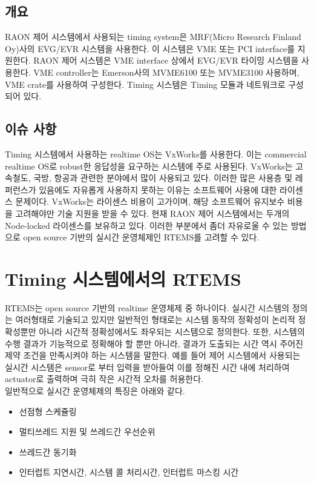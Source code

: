 \documentclass[11pt
  , a4paper
  , article
  , oneside
]{memoir}
\begin{document}
\section{개요}
RAON 제어 시스템에서 사용되는 timing system은 MRF(Micro Research Finland Oy)사의 EVG/EVR\cite{evgevr} 시스템을 사용한다. 이 시스템은 VME 또는 PCI interface를 지원한다. RAON 제어 시스템은 VME interface 상에서 EVG/EVR 타이밍 시스템을 사용한다. VME controller는 Emerson사의 MVME6100\cite{mvme6100} 또는 MVME3100\cite{mvme3100} 사용하며, VME crate를 사용하여 구성한다. Timing 시스템은 Timing 모듈과 네트워크로 구성되어 있다.

\section{이슈 사항}
Timing 시스템에서 사용하는 realtime OS는 VxWorks를 사용한다. 이는 commercial realtime OS로 robust한 응답성을 요구하는 시스템에 주로 사용된다. VxWorks는 고속철도, 국방, 항공과 관련한 분야에서 많이 사용되고 있다.
이러한 많은 사용층 및 레퍼런스가 있음에도 자유롭게 사용하지 못하는 이유는 소프트웨어 사용에 대한 라이센스 문제이다. VxWorks는 라이센스 비용이 고가이며, 해당 소프트웨어 유지보수 비용을 고려해야만 기술 지원을 받을 수 있다. 현재 RAON 제어 시스템에서는 두개의 Node-locked 라이센스를 보유하고 있다. 이러한 부분에서 좀더 자유로울 수 있는 방법으로 open source 기반의 실시간 운영체제인 RTEMS를 고려할 수 있다.

\chapter{Timing 시스템에서의 RTEMS}
RTEMS\cite{rtems}는 open source 기반의 realtime 운영체제 중 하나이다. 실시간 시스템의 정의는 여러형태로 기술되고 있지만 일반적인 형태로는 시스템 동작의 정확성이 논리적 정확성뿐만 아니라 시간적 정확성에서도 좌우되는 시스템으로 정의한다. 또한, 시스템의 수행 결과가 기능적으로 정확해야 할 뿐만 아니라, 결과가 도출되는 시간 역시 주어진 제약 조건을 만족시켜야 하는 시스템을 말한다. 예를 들어 제어 시스템에서 사용되는 실시간 시스템은 sensor로 부터 입력을 받아들여 이를 정해진 시간 내에 처리하여 actuator로 출력하며 극히 작은 시간적 오차를 허용한다. \\

일반적으로 실시간 운영체제의 특징은 아래와 같다.

\begin{itemize}
	\item 선점형 스케쥴링
	\item 멀티쓰레드 지원 및 쓰레드간 우선순위
	\item 쓰레드간 동기화
	\item 인터럽트 지연시간, 시스템 콜 처리시간, 인터럽트 마스킹 시간
\end{itemize}
\end{document}
